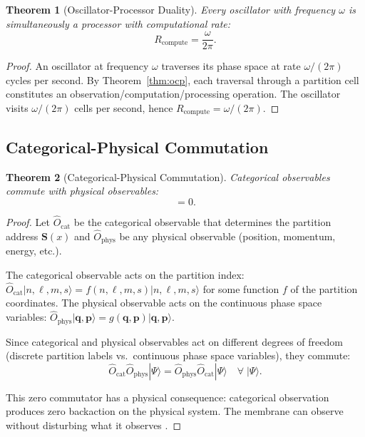 \documentclass[twocolumn,10pt]{article}
\newtheorem{theorem}{Theorem}[section]
\theoremstyle{definition}
\theoremstyle{remark}
\newcommand{\Ocat}{\hat{O}_{\mathrm{cat}}}
\newcommand{\Ophys}{\hat{O}_{\mathrm{phys}}}
\newcommand{\Rcompute}{R_{\mathrm{compute}}}
\begin{document}
\begin{theorem}[Oscillator-Processor Duality]
\label{thm:osc_proc}
Every oscillator with frequency $\omega$ is simultaneously a processor with computational rate:
\begin{equation}
  \Rcompute = \frac{\omega}{2\pi}.
  \label{eq:osc_proc}
\end{equation}
\end{theorem}

\begin{proof}
An oscillator at frequency $\omega$ traverses its phase space at rate $\omega/(2\pi)$ cycles per second. By Theorem~\ref{thm:ocp}, each traversal through a partition cell constitutes an observation/computation/processing operation. The oscillator visits $\omega/(2\pi)$ cells per second, hence $\Rcompute = \omega/(2\pi)$.
\end{proof}

\subsection{Categorical-Physical Commutation}

\begin{theorem}[Categorical-Physical Commutation]
\label{thm:commutation}
Categorical observables commute with physical observables:
\begin{equation}
  [\Ocat, \Ophys] = 0.
  \label{eq:commutation}
\end{equation}
\end{theorem}

\begin{proof}
Let $\Ocat$ be the categorical observable that determines the partition address $\mathbf{S}(x)$ and $\Ophys$ be any physical observable (position, momentum, energy, etc.).

The categorical observable acts on the partition index: $\Ocat |n, \ell, m, s\rangle = f(n,\ell,m,s)|n,\ell,m,s\rangle$ for some function $f$ of the partition coordinates. The physical observable acts on the continuous phase space variables: $\Ophys |\mathbf{q}, \mathbf{p}\rangle = g(\mathbf{q},\mathbf{p})|\mathbf{q},\mathbf{p}\rangle$.

Since categorical and physical observables act on different degrees of freedom (discrete partition labels vs.\ continuous phase space variables), they commute:
\begin{equation}
  \Ocat \Ophys |\Psi\rangle = \Ophys \Ocat |\Psi\rangle \quad \forall\; |\Psi\rangle.
  \label{eq:commutation_proof}
\end{equation}

This zero commutator has a physical consequence: categorical observation produces zero backaction on the physical system. The membrane can observe without disturbing what it observes \cite{sachikonye2025quantum}.
\end{proof}
\end{document}

